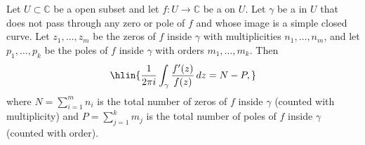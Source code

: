 \begin{theorem} \label{theorem:argument_principle_for_meromorphic_functions_relating_contour_integral_of_f_prime_over_f_to_zeros_and_poles}
    Let $U \subset \mathbb{C}$ be a  open subset and let $f : U \to \mathbb{C}$ be a  on $U$. Let $\gamma$ be a   in $U$ that does not pass through any zero or pole of $f$ and whose image is a simple closed curve. Let $z_1, \ldots, z_m$ be the zeros of $f$ inside $\gamma$ with multiplicities $n_1, \ldots, n_m$, and let $p_1, \ldots, p_k$ be the poles of $f$ inside $\gamma$ with orders $m_1, \ldots, m_k$. Then
    $$\hlin{\frac{1}{2\pi i} \int_{\gamma} \frac{f'(z)}{f(z)} \, dz = N - P,}$$
    where $N = \sum_{i=1}^{m} n_i$ is the total number of zeros of $f$ inside $\gamma$ (counted with multiplicity) and $P = \sum_{j=1}^{k} m_j$ is the total number of poles of $f$ inside $\gamma$ (counted with order).
\end{theorem}

